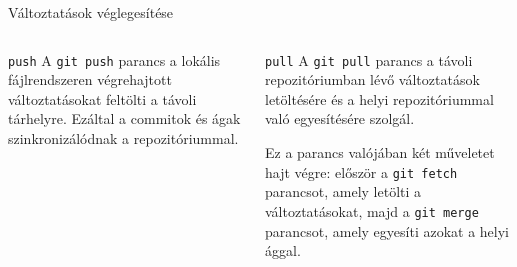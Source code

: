 \documentclass[english, aspectratio=169]{beamer}
\begin{document}
	\begin{frame}{Változtatások véglegesítése}
		\begin{columns}
			\begin{column}{.5\textwidth}
				\begin{block}{\texttt{push}}
					A \texttt{git push} parancs a lokális fájlrendszeren végrehajtott változtatásokat feltölti a távoli tárhelyre. Ezáltal a commitok és ágak szinkronizálódnak a repozitóriummal.
				\end{block}
			\end{column}
			\begin{column}{.5\textwidth}
				\begin{block}{\texttt{pull}}
					A \texttt{git pull} parancs a távoli repozitóriumban lévő változtatások letöltésére és a helyi repozitóriummal való egyesítésére szolgál.\par \smallskip
					Ez a parancs valójában két műveletet hajt végre: először a \texttt{git fetch} parancsot, amely letölti a változtatásokat, majd a \texttt{git merge} parancsot, amely egyesíti azokat a helyi ággal.
				\end{block}
			\end{column}
		\end{columns}
	\end{frame}
\end{document}
